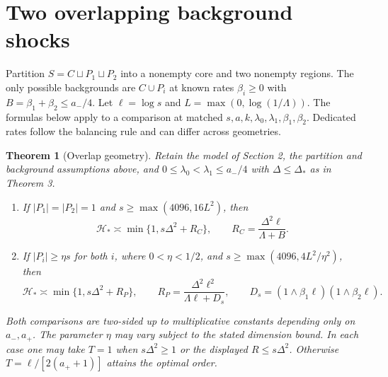 \documentclass[11pt]{article}
\newtheorem{theorem}{Theorem}
\providecommand{\tightlist}{\setlength{\itemsep}{0pt}\setlength{\parskip}{0pt}}
\begin{document}
\section{Two overlapping background shocks}\label{two-overlapping-background-shocks}

Partition \(S=C\sqcup P_1\sqcup P_2\) into a nonempty core and two nonempty regions. The only possible backgrounds are \(C\cup P_i\) at known rates \(\beta_i\ge0\) with \(B=\beta_1+\beta_2\le a_-/4\). Let \(\ell=\log s\) and \(L=\max(0,\log(1/\Lambda))\). The formulas below apply to a comparison at matched \(s,a,k,\lambda_0,\lambda_1,\beta_1,\beta_2\). Dedicated rates follow the balancing rule and can differ across geometries.

\begin{theorem}[Overlap geometry] Retain the model of Section 2, the partition and background assumptions above, and \(0\le\lambda_0<\lambda_1\le a_-/4\) with \(\Delta\le\Delta_*\) as in Theorem 3.

\begin{enumerate}
\def\labelenumi{\arabic{enumi}.}
\tightlist
\item
  If \(|P_1|=|P_2|=1\) and \(s\ge\max(4096,16L^2)\), then \[
  \mathcal H_*\asymp\min\{1,s\Delta^2+R_C\},\qquad
  R_C=\frac{\Delta^2\ell}{\Lambda+B}.
  \tag{14}
  \]
\item
  If \(|P_i|\ge\eta s\) for both \(i\), where \(0<\eta<1/2\), and \(s\ge\max(4096,4L^2/\eta^2)\), then \[
  \mathcal H_*\asymp\min\{1,s\Delta^2+R_P\},\qquad
  R_P=\frac{\Delta^2\ell^2}{\Lambda\ell+D_s},\qquad
  D_s=(1\wedge\beta_1\ell)(1\wedge\beta_2\ell).
  \tag{15}
  \]
\end{enumerate}

Both comparisons are two-sided up to multiplicative constants depending only on \(a_-,a_+\). The parameter \(\eta\) may vary subject to the stated dimension bound. In each case one may take \(T=1\) when \(s\Delta^2\ge1\) or the displayed \(R\le s\Delta^2\). Otherwise \(T=\ell/[2(a_++1)]\) attains the optimal order.

\end{theorem}
\end{document}
